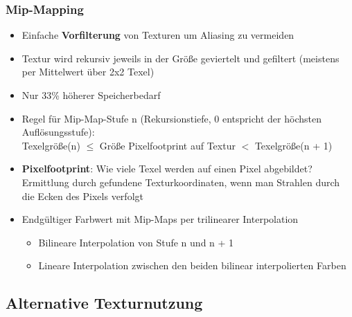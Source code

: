 \documentclass[10pt,a4paper]{article}
\begin{document}
	\subsubsection{Mip-Mapping}
	\label{subs:mip_mapping}
	
	\begin{itemize}
		\item Einfache \textbf{Vorfilterung} von Texturen um Aliasing zu vermeiden
		\item Textur wird rekursiv jeweils in der Größe geviertelt und gefiltert (meistens per Mittelwert über 2x2 Texel)
		\item Nur 33\% höherer Speicherbedarf
		\item Regel für Mip-Map-Stufe n (Rekursionstiefe, 0 entspricht der höchsten Auflösungsstufe):\\Texelgröße(n) $\leq$ Größe Pixelfootprint auf Textur $<$ Texelgröße(n + 1)
		\item \textbf{Pixelfootprint}: Wie viele Texel werden auf einen Pixel abgebildet? Ermittlung durch gefundene Texturkoordinaten, wenn man Strahlen durch die Ecken des Pixels verfolgt
		\item Endgültiger Farbwert mit Mip-Maps per trilinearer Interpolation
		\begin{itemize}
			\item Bilineare Interpolation von Stufe n und n + 1
			\item Lineare Interpolation zwischen den beiden bilinear interpolierten Farben
		\end{itemize}
	\end{itemize}

	\subsection{Alternative Texturnutzung}
	\label{sub:alternative_texturnutzung}
\end{document}
